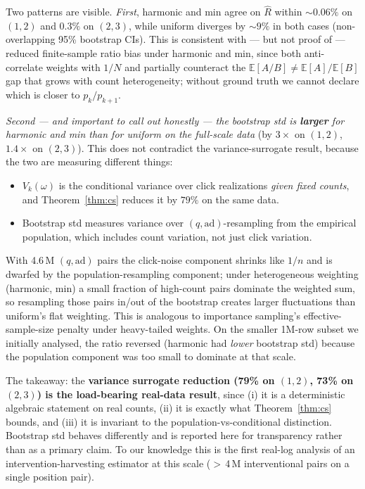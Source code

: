 \documentclass[sigconf]{acmart}
\begin{document}
Two patterns are visible. \emph{First}, harmonic and min agree on $\hat R$ within
$\sim 0.06\%$ on $(1,2)$ and $0.3\%$ on $(2,3)$, while uniform diverges by
$\sim 9\%$ in both cases (non-overlapping 95\% bootstrap CIs). This is consistent
with --- but not proof of --- reduced finite-sample ratio bias under harmonic and
min, since both anti-correlate weights with $1/N$ and partially counteract the
$\mathbb{E}[A/B]\neq \mathbb{E}[A]/\mathbb{E}[B]$ gap that grows with count
heterogeneity; without ground truth we cannot declare which is closer to
$p_k/p_{k+1}$.

\emph{Second --- and important to call out honestly --- the bootstrap std is
\textbf{larger} for harmonic and min than for uniform on the full-scale data}
(by $3\times$ on $(1,2)$, $1.4\times$ on $(2,3)$). This does not contradict
the variance-surrogate result, because the two are measuring different things:
\begin{itemize}
\item $V_k(\omega)$ is the conditional variance over click realizations
  \emph{given fixed counts}, and Theorem~\ref{thm:cs} reduces it by $79\%$
  on the same data.
\item Bootstrap std measures variance over $(q,\mathrm{ad})$-resampling from
  the empirical population, which includes count variation, not just click
  variation.
\end{itemize}
With 4.6\,M $(q,\mathrm{ad})$ pairs the click-noise component shrinks like
$1/n$ and is dwarfed by the population-resampling component; under
heterogeneous weighting (harmonic, min) a small fraction of high-count
pairs dominate the weighted sum, so resampling those pairs in/out of the
bootstrap creates larger fluctuations than uniform's flat weighting. This is
analogous to importance sampling's effective-sample-size penalty under
heavy-tailed weights. On the smaller 1M-row subset we initially analysed, the
ratio reversed (harmonic had \emph{lower} bootstrap std) because the population
component was too small to dominate at that scale.

The takeaway: the \textbf{variance surrogate reduction (79\% on $(1,2)$, 73\% on
$(2,3)$) is the load-bearing real-data result}, since (i) it is a deterministic
algebraic statement on real counts, (ii) it is exactly what
Theorem~\ref{thm:cs} bounds, and (iii) it is invariant to the population-vs-conditional
distinction. Bootstrap std behaves differently and is reported here for transparency
rather than as a primary claim. To our knowledge this is the first real-log
analysis of an intervention-harvesting estimator at this scale ($>$\,4\,M
interventional pairs on a single position pair).
\end{document}
